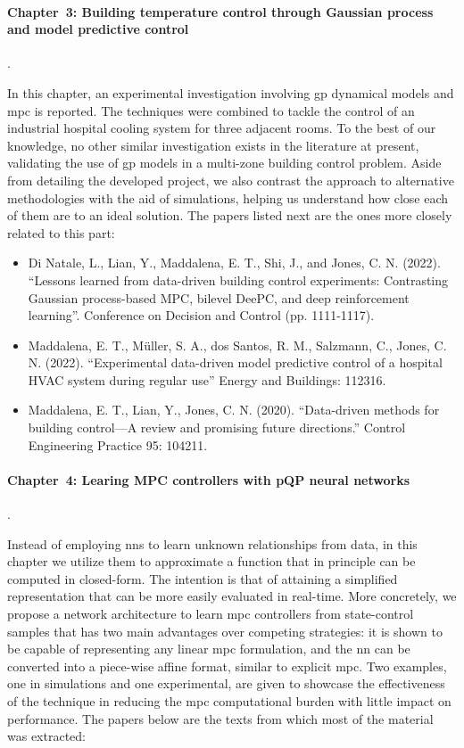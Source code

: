 \paragraph{Chapter~3: Building temperature control through Gaussian process and model predictive control}.

In this chapter, an experimental investigation involving \ac{gp} dynamical models and \ac{mpc} is reported. The techniques were combined to tackle the control of an industrial hospital cooling system for three adjacent rooms. To the best of our knowledge, no other similar investigation exists in the literature at present, validating the use of \ac{gp} models in a multi-zone building control problem. Aside from detailing the developed project, we also contrast the approach to alternative methodologies with the aid of simulations, helping us understand how close each of them are to an ideal solution. The papers listed next are the ones more closely related to this part: 

\begin{itemize}
	\item Di Natale, L., Lian, Y., Maddalena, E. T., Shi, J., and Jones, C. N. (2022). ``Lessons learned from data-driven building control experiments: Contrasting Gaussian process-based MPC, bilevel DeePC, and deep reinforcement learning''. Conference on Decision and Control (pp. 1111-1117). 
	
	\item Maddalena, E. T., Müller, S. A., dos Santos, R. M., Salzmann, C., Jones, C. N. (2022). ``Experimental data-driven model predictive control of a hospital HVAC system during regular use'' Energy and Buildings: 112316.
	
	\item Maddalena, E. T., Lian, Y., Jones, C. N. (2020). ``Data-driven methods for building control—A review and promising future directions.'' Control Engineering Practice 95: 104211.
\end{itemize}

\paragraph{Chapter~4: Learing MPC controllers with pQP neural networks}.

Instead of employing \acp{nn} to learn unknown relationships from data, in this chapter we utilize them to approximate a function that in principle can be computed in closed-form. The intention is that of attaining a simplified representation that can be more easily evaluated in real-time. More concretely, we propose a network architecture to learn \ac{mpc} controllers from state-control samples that has two main advantages over competing strategies: it is shown to be capable of representing any linear \ac{mpc} formulation, and the \ac{nn} can be converted into a piece-wise affine format, similar to explicit \ac{mpc}. Two examples, one in simulations and one experimental, are given to showcase the effectiveness of the technique in reducing the \ac{mpc} computational burden with little impact on performance. The papers below are the texts from which most of the material was extracted:

